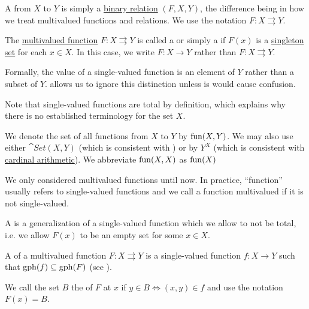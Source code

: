 \begin{definition}\label{def:function}
  A  from \( X \) to \( Y \) is simply a \hyperref[def:binary_relation]{binary relation} \( (F, X, Y) \), the difference being in how we treat multivalued functions and relations. We use the notation \( F: X \rightrightarrows Y \).

  \begin{defenum}[series=def:function]
     The \hyperref[def:function/multivalued]{multivalued function} \( F: X \rightrightarrows Y \) is called a  or simply a  if \( F(x) \) is a \hyperref[rem:singleton_sets]{singleton set} for each \( x \in X \). In this case, we write \( F: X \to Y \) rather than \( F: X \rightrightarrows Y \).

    Formally, the value of a single-valued function is an element of \( Y \) rather than a subset of \( Y \).  allows us to ignore this distinction unless is would cause confusion.

    Note that single-valued functions are total by definition, which explains why there is no established terminology for the set \( X \).

    We denote the set of all functions from \( X \) to \( Y \) by \( \operatorname{fun}(X, Y) \). We may also use either \( \cat{Set}(X, Y) \) (which is consistent with ) or by \( Y^X \) (which is consistent with \hyperref[def:cardinal_arithmetic]{cardinal arithmetic}). We abbreviate \( \operatorname{fun}(X, X) \) as \( \operatorname{fun}(X) \)

     We only considered multivalued functions until now. In practice, \enquote{function} usually refers to single-valued functions and we call a function multivalued if it is not single-valued.

     A  is a generalization of a single-valued function which we allow to not be total, i.e. we allow \( F(x) \) to be an empty set for some \( x \in X \).

     A  of a multivalued function \( F: X \rightrightarrows Y \) is a single-valued function \( f: X \to Y \) such that \( \operatorname{gph}(f) \subseteq \operatorname{gph}(F) \) (see ).

     We call the set \( B \) the  of \( F \) at \( x \) if \( y \in B \iff (x, y) \in f \) and use the notation \( F(x) = B \).


\end{defenum}
\end{definition}
